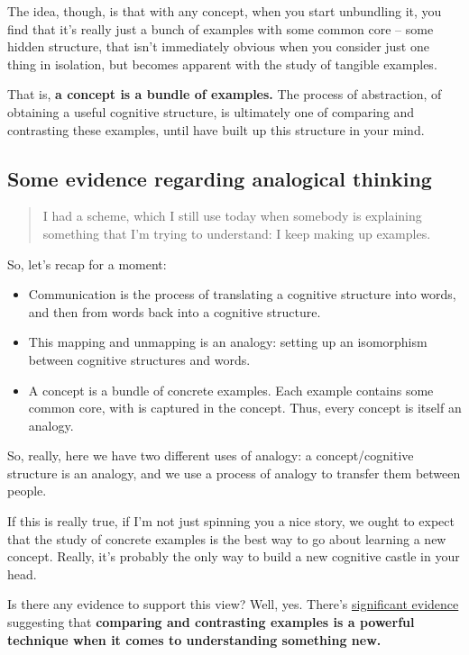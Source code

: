 The idea, though, is that with any concept, when you start unbundling
it, you find that it's really just a bunch of examples with some common
core -- some hidden structure, that isn't immediately obvious when you
consider just one thing in isolation, but becomes apparent with the
study of tangible examples.

That is, \textbf{a concept is a bundle of examples.} The process of
abstraction, of obtaining a useful cognitive structure, is ultimately
one of comparing and contrasting these examples, until have built up
this structure in your mind.

\subsection{Some evidence regarding analogical
  thinking}\label{some-evidence-regarding-analogical-thinking}

\begin{quote}
I had a scheme, which I still use today when somebody is explaining something
that I'm trying to understand: I keep making up examples.
\end{quote}

So, let's recap for a moment:

\begin{itemize}
\itemsep1pt\parskip0pt
\item
  Communication is the process of translating a cognitive structure into
  words, and then from words back into a cognitive structure.
\item
  This mapping and unmapping is an analogy: setting up an isomorphism
  between cognitive structures and words.
\item
  A concept is a bundle of concrete examples. Each example contains some
  common core, with is captured in the concept. Thus, every concept is
  itself an analogy.
\end{itemize}

So, really, here we have two different uses of analogy: a
concept/cognitive structure is an analogy, and we use a process of
analogy to transfer them between people.

If this is really true, if I'm not just spinning you a nice story, we
ought to expect that the study of concrete examples is the best way to
go about learning a new concept. Really, it's probably the only way to
build a new cognitive castle in your head.

Is there any evidence to support this view? Well, yes. There's
\href{http://psycnet.apa.org/journals/edu/95/2/393/}{significant
evidence} suggesting that \textbf{comparing and contrasting examples is
a powerful technique when it comes to understanding something new.}

